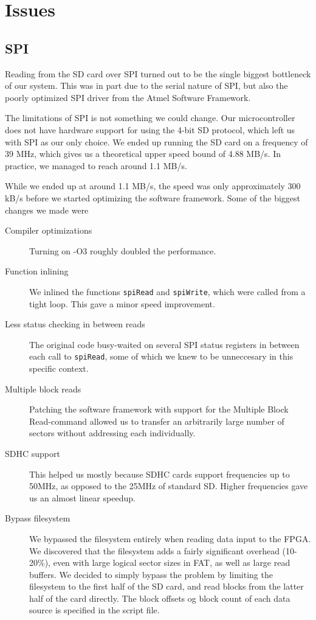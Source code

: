 \section{Issues}

\subsection{SPI}
\label{sec:avr-spi-issues}
Reading from the \ac{SD} card over \ac{SPI} turned out to be the single biggest
bottleneck of our system. This was in part due to the serial nature of \ac{SPI},
but also the poorly optimized \ac{SPI} driver from the Atmel Software Framework.

The limitations of \ac{SPI} is not something we could change. Our
microcontroller does not have hardware support for using the 4-bit \ac{SD}
protocol, which left us with \ac{SPI} as our only choice. We ended up running
the \ac{SD} card on a frequency of 39 MHz, which gives us a theoretical upper
speed bound of 4.88 MB/s. In practice, we managed to reach around 1.1 MB/s.

While we ended up at around 1.1 MB/s, the speed was only approximately 300 kB/s
before we started optimizing the software framework. Some of the biggest changes
we made were
\begin{description}
\item[Compiler optimizations] Turning on -O3 roughly doubled
  the performance.
\item[Function inlining] We inlined the functions {\tt spiRead} and
  {\tt spiWrite}, which were called from a tight loop. This gave a minor speed
  improvement.
\item[Less status checking in between reads] The original code busy-waited on
  several \ac{SPI} status registers in between each call to {\tt spiRead}, some
  of which we knew to be unneccesary in this specific context.
\item[Multiple block reads] Patching the software framework with support for the
  Multiple Block Read-command allowed us to transfer an arbitrarily large number
  of sectors without addressing each individually.
\item[SDHC support] This helped us mostly because \ac{SDHC} cards support
  frequencies up to 50MHz, as opposed to the 25MHz of standard \ac{SD}. Higher
  frequencies gave us an almost linear speedup.
\item[Bypass filesystem] We bypassed the filesystem entirely when reading data
  input to the \ac{FPGA}. We discovered that the filesystem adds a fairly
  significant overhead (10-20\%), even with large logical sector sizes in
  \ac{FAT}, as well as large read buffers. We decided to simply bypass the
  problem by limiting the filesystem to the first half of the \ac{SD} card, and
  read blocks from the latter half of the card directly. The block offsets og
  block count of each data source is specified in the script file.
\end{description}

